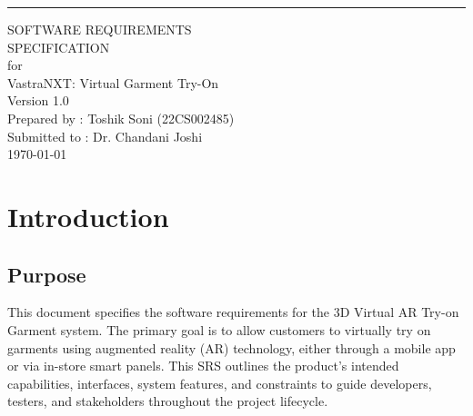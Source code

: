 \documentclass{scrreprt}
\date{}
\def\myversion{1.0 }
\begin{document}
\begin{flushright}
    \rule{16cm}{5pt}\vskip1cm
    \begin{bfseries}
        \Huge{SOFTWARE REQUIREMENTS\\ SPECIFICATION}\\
        \vspace{1.5cm}
        for\\
        \vspace{1.5cm}
        VastraNXT: Virtual Garment Try-On\\
        \vspace{1.5cm}
        \LARGE{Version \myversion}\\
        \vspace{1.5cm}
        Prepared by : Toshik Soni (22CS002485)\\
        \vspace{1.5cm}
        Submitted to : Dr. Chandani Joshi\\
        \vspace{1.5cm}
        \today\\
    \end{bfseries}
\end{flushright}

\tableofcontents

\chapter{Introduction}

\section{Purpose}
This document specifies the software requirements for the 3D Virtual AR Try-on Garment system. The primary goal is to allow customers to virtually try on garments using augmented reality (AR) technology, either through a mobile app or via in-store smart panels. This SRS outlines the product’s intended capabilities, interfaces, system features, and constraints to guide developers, testers, and stakeholders throughout the project lifecycle.
\end{document}
